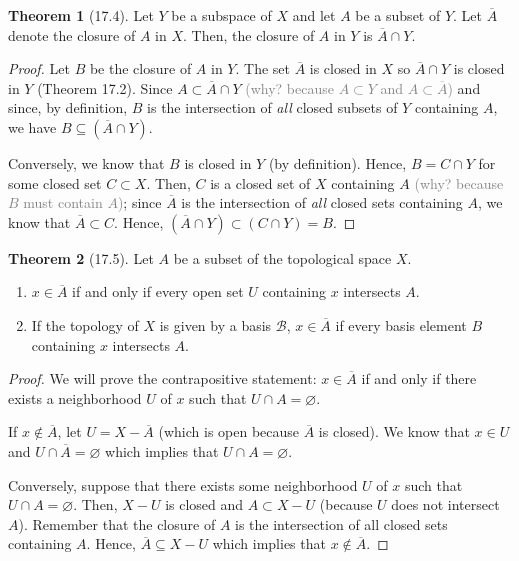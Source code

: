 \documentclass{article}
\newcommand{\nline}{\vspace*{0.5\baselineskip}}
\newcommand{\com}[1]{\textcolor{grey}{#1}}
\theoremstyle{definition}
\newtheorem{theorem}{Theorem}[subsection]
\begin{document}
\begin{flushleft}
\begin{theorem}[17.4]
Let $Y$ be a subspace of $X$ and let $A$ be a subset of $Y$. Let $\overline{A}$ denote the closure of $A$ in $X$. Then, the closure of $A$ in $Y$ is $\overline{A} \cap Y$.
\end{theorem}

\begin{proof}
Let $B$ be the closure of $A$ in $Y$. The set $\overline{A}$ is closed in $X$ so $\overline{A} \cap Y$ is closed in $Y$ (Theorem 17.2). Since $A \subset \overline{A} \cap Y$ \com{(why? because $A \subset Y$ and $A \subset \overline{A}$)} and since, by definition, $B$ is the intersection of \textit{all} closed subsets of $Y$ containing $A$, we have $B \subseteq (\overline{A} \cap Y)$.

\nline

Conversely, we know that $B$ is closed in $Y$ (by definition). Hence, $B = C \cap Y$ for some closed set $C \subset X$. Then, $C$ is a closed set of $X$ containing $A$ \com{(why? because $B$ must contain $A$)}; since $\overline{A}$ is the intersection of \textit{all} closed sets containing $A$, we know that $\overline{A} \subset C$. Hence, $(\overline{A} \cap Y) \subset (C \cap Y) = B$.
\end{proof}

\begin{theorem}[17.5]
Let $A$ be a subset of the topological space $X$.
\begin{enumerate}
    \item $x \in \overline{A}$ if and only if every open set $U$ containing $x$ intersects $A$.
    \item If the topology of $X$ is given by a basis $\mathcal{B}$, $x \in \overline{A}$ if every basis element $B$ containing $x$ intersects $A$.
\end{enumerate}
\end{theorem}

\begin{proof}
We will prove the contrapositive statement: $x \in \overline{A}$ if and only if there exists a neighborhood $U$ of $x$ such that $U \cap A = \varnothing$.

\nline

If $x \notin \overline{A}$, let $U = X - \overline{A}$ (which is open because $\overline{A}$ is closed). We know that $x \in U$ and $U \cap \overline{A} = \varnothing$ which implies that $U \cap A = \varnothing$.

\nline

Conversely, suppose that there exists some neighborhood $U$ of $x$ such that $U \cap A = \varnothing$. Then, $X - U$ is closed and $A \subset X - U$ (because $U$ does not intersect $A$). Remember that the closure of $A$ is the intersection of all closed sets containing $A$. Hence, $\overline{A} \subseteq X - U$ which implies that $x \notin \overline{A}$.
\end{proof}


\end{flushleft}
\end{document}
